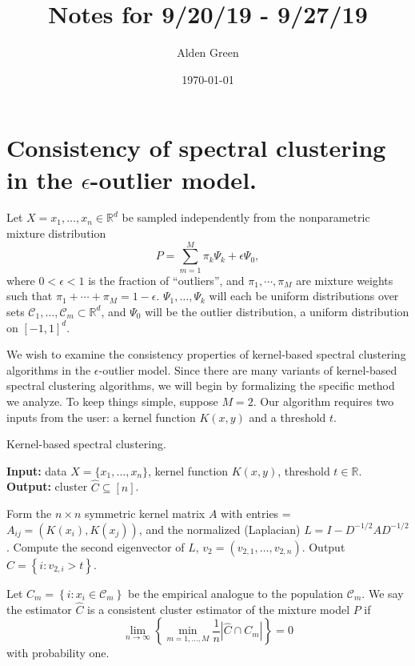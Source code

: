 \documentclass{article}
\newcommand{\Reals}{\mathbb{R}}
\newcommand{\abs}[1]{\left \lvert #1 \right \rvert}
\newcommand{\set}[1]{\left\{#1\right\}}
\newcommand{\1}{\mathbf{1}}
\newcommand{\Rd}{\Reals^d}
\theoremstyle{alden}
\theoremstyle{aldenthm}
\theoremstyle{definition}
\theoremstyle{remark}
\begin{document}
\title{Notes for 9/20/19 - 9/27/19}
\author{Alden Green}
\date{\today}
\maketitle

\section{Consistency of spectral clustering in the $\epsilon$-outlier model.}

Let $X = x_1,\ldots,x_n \in \Rd$ be sampled independently from the nonparametric mixture distribution
\begin{equation*}
P = \sum_{m = 1}^{M} \pi_k \Psi_k + \epsilon \Psi_0,
\end{equation*}
where $0 < \epsilon < 1$ is the fraction of ``outliers'', and $\pi_1,\cdots,\pi_M$ are mixture weights such that $\pi_1 + \cdots + \pi_M = 1 - \epsilon$. $\Psi_1, \ldots, \Psi_k$ will each be uniform distributions over sets $\mathcal{C}_1, \ldots, \mathcal{C}_m \subset \Rd$, and $\Psi_0$ will be the outlier distribution, a uniform distribution on $[-1,1]^d$. 

We wish to examine the consistency properties of kernel-based spectral clustering algorithms in the $\epsilon$-outlier model. Since there are many variants of kernel-based spectral clustering algorithms, we will begin by formalizing the specific method we analyze. To keep things simple, suppose $M = 2$. Our algorithm requires two inputs from the user: a kernel function $K(x,y)$ and a threshold $t$. 

\begin{algorithm}
	\caption{Kernel-based spectral clustering.}
	\label{alg: ppr}	
	{\bfseries Input:} data $X =\{x_1,\ldots,x_n\}$, kernel function $K(x,y)$, threshold $t \in \Reals$. \\     
	{\bfseries Output:} cluster $\widehat{C} \subseteq [n]$.
	\begin{algorithmic}[1]
		\STATE Form the $n \times n$ symmetric kernel matrix $A$ with entries = $A_{ij} = (K(x_i),K(x_j))$, and the normalized (Laplacian) $L = I - D^{-1/2}AD^{-1/2}$. 
		\STATE Compute the second eigenvector of $L$, $v_2 = (v_{2,1},\ldots,v_{2,n})$. 
		\STATE Output $\widehat{C} = \set{i: v_{2,i} > t}$. 
	\end{algorithmic}
\end{algorithm}

Let $C_m = \set{i: x_i \in \mathcal{C}_m}$ be the empirical analogue to the population $\mathcal{C}_m$. We say the estimator $\widehat{C}$ is a consistent cluster estimator of the mixture model $P$ if
\begin{equation*}
\lim_{n \to \infty} \left\{\min_{m = 1,\ldots,M} \frac{1}{n} \abs{\widehat{C} \cap C_m} \right\} = 0
\end{equation*}
with probability one.
\end{document}
